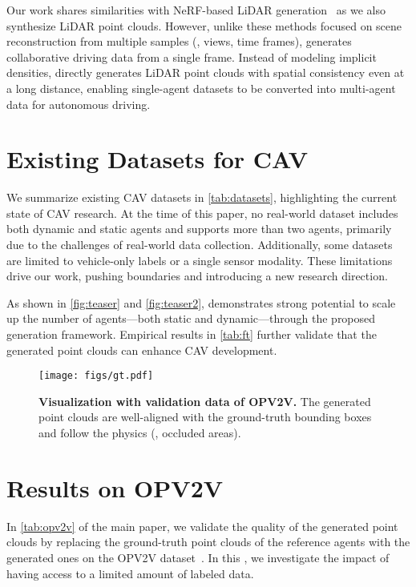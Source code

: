 Our work shares similarities with NeRF-based LiDAR generation~\citep{huang2023neural, tao2024lidarnerf, zhang2024nerf, zheng2024lidar4d} as we also synthesize LiDAR point clouds. However, unlike these methods focused on scene reconstruction from multiple samples (\eg, views, time frames), \ours generates collaborative driving data from a single frame. Instead of modeling implicit densities, \ours directly generates LiDAR point clouds with spatial consistency even at a long distance, enabling single-agent datasets to be converted into multi-agent data for autonomous driving.



\section{Existing Datasets for CAV}
\label{sup:datasets}

We summarize existing CAV datasets in \cref{tab:datasets}, highlighting the current state of CAV research. At the time of this paper, no real-world dataset includes both dynamic and static agents and supports more than two agents, primarily due to the challenges of real-world data collection. Additionally, some datasets are limited to vehicle-only labels or a single sensor modality. These limitations drive our work, pushing boundaries and introducing a new research direction.

As shown in \cref{fig:teaser} and \cref{fig:teaser2}, \ours demonstrates strong potential to scale up the number of agents---both static and dynamic---through the proposed generation framework. Empirical results in \cref{tab:ft} further validate that the generated point clouds can enhance CAV development.

\begin{figure}[t]
\centering
\texttt{[image: figs/gt.pdf]}
\caption{
\label{fig:gt}
\small \textbf{Visualization with validation data of OPV2V.} The generated point clouds are well-aligned with the ground-truth bounding boxes and follow the physics (\eg, occluded areas).
}
\end{figure}

\section{Results on OPV2V}
\label{sup:opv2v}

In \cref{tab:opv2v} of the main paper, we validate the quality of the generated point clouds by replacing the ground-truth point clouds of the reference agents with the generated ones on the OPV2V dataset~\citep{xu2022opv2v}. In this \supp, we investigate the impact of having access to a limited amount of labeled data.

